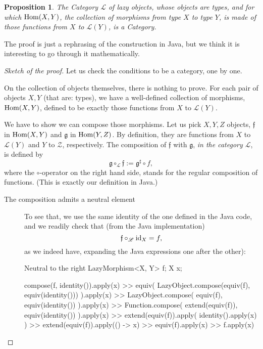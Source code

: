\documentclass[12pt,a4paper]{report}
\renewcommand{\baselinestretch}{1.5}
\theoremstyle{theorem}
\newtheorem{proposition}{Proposition}
\theoremstyle{definition}
\begin{document}
\begin{proposition}
The Category $\mathscr{L}$ of lazy objects,
whose objects are types, and for which ${\rm Hom}(X,Y)$,
the collection of morphisms from type $X$ to type $Y$,
is made of those functions from $X$ to $\mathcal{L}(Y)$,
is a Category.
\end{proposition}
The proof is just a rephrasing of the construction in Java,
but we think it is interesting to go through it mathematically.
\begin{proof}[Sketch of the proof]
Let us check the conditions to be a category, one by one.

On the collection of objects themselves, there is nothing to prove.
For each pair of objects $X,Y$ (that are: types),
we have a well-defined collection of morphisms, ${\rm Hom}(X,Y)$,
defined to be exactly those functions from $X$ to $\mathcal{L}(Y)$.

We have to show we can compose those morphisms.
Let us pick $X,Y,Z$ objects,
$\mathfrak{f}$ in ${\rm Hom}(X,Y)$
and $\mathfrak{g}$ in ${\rm Hom}(Y,Z)$.
By definition, they are functions from $X$ to $\mathcal{L}(Y)$
and $Y$ to $\mathcal{Z}$, respectively. The composition of
$\mathfrak{f}$ with $\mathfrak{g}$, \emph{in the category $\mathscr{L}$},
is defined by
	\[ \mathfrak{g}\circ_{\mathscr{L}}\mathfrak{f}
		:= \mathfrak{g}^\sharp \circ f ,\]
where the $\circ$-operator on the right hand side, stands for the regular
composition of functions. (This is exactly our definition in Java.)

\begin{description}
	\item[The composition admits a neutral element]
	To see that, we use the same identity of the one defined
	in the Java code, and we readily check that (from the Java implementation)
		\[ \mathfrak{f}\circ_{\mathscr{L}} {\rm id}_X = f ,\]
	as we indeed have, expanding the Java expressions one after the other):
	
\renewcommand{\baselinestretch}{1} 
\selectfont

\begin{javacode}{Neutral to the right}
LazyMorphism<X, Y> f;
X x;

compose(f, identity()).apply(x)
 >> equiv(
      LazyObject.compose(equiv(f), equiv(identity()))
    ).apply(x)
 >> LazyObject.compose(
      equiv(f), equiv(identity())
    ).apply(x)
 >> Function.compose(
      extend(equiv(f)), equiv(identity())
    ).apply(x)
 >> extend(equiv(f)).apply(
      identity().apply(x)
    )
 >> extend(equiv(f)).apply(() -> x)
 >> equiv(f).apply(x)
 >> f.apply(x)
\end{javacode}


\end{description}
\end{proof}
\end{document}
